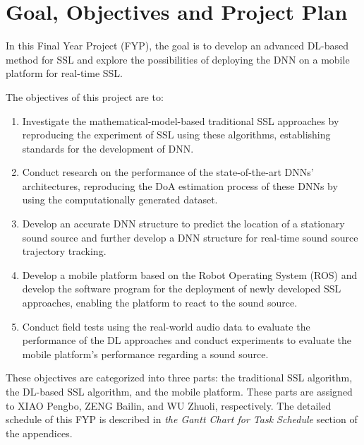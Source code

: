 \chapter*{Goal, Objectives and Project Plan}

In this Final Year Project (FYP), the goal is to develop an advanced DL-based method for SSL and explore the possibilities of deploying the DNN on a mobile platform for real-time SSL.

The objectives of this project are to:
\begin{enumerate}
    \item Investigate the mathematical-model-based traditional SSL approaches by reproducing the experiment of SSL using these algorithms, establishing standards for the development of DNN.
    \item Conduct research on the performance of the state-of-the-art DNNs' architectures, reproducing the DoA estimation process of these DNNs by using the computationally generated dataset.
    \item Develop an accurate DNN structure to predict the location of a stationary sound source and further develop a DNN structure for real-time sound source trajectory tracking.
    \item Develop a mobile platform based on the Robot Operating System (ROS) and develop the software program for the deployment of newly developed SSL approaches, enabling the platform to react to the sound source.
    \item Conduct field tests using the real-world audio data to evaluate the performance of the DL approaches and conduct experiments to evaluate the mobile platform's performance regarding a sound source.
\end{enumerate}

These objectives are categorized into three parts: the traditional SSL algorithm, the DL-based SSL algorithm, and the mobile platform. These parts are assigned to XIAO Pengbo, ZENG Bailin, and WU Zhuoli, respectively. The detailed schedule of this FYP is described in \textit{the Gantt Chart for Task Schedule} section of the appendices.



